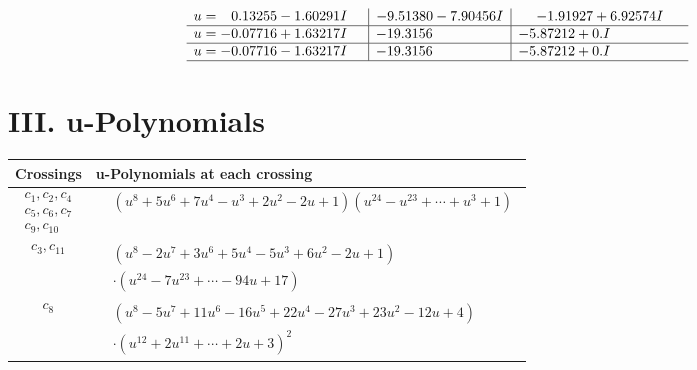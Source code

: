 \documentclass[1p]{elsarticle_modified}
\theoremstyle{definition}
\begin{document}
$$\begin{array}{c|c|c}
\begin{aligned}
u &= \phantom{-}0.13255 - 1.60291 I\end{aligned}
 & -9.51380 - 7.90456 I & -1.91927 + 6.92574 I \\ \hline\begin{aligned}
u &= -0.07716 + 1.63217 I\end{aligned}
 & -19.3156\phantom{ +0.000000I} & -5.87212 + 0. I\phantom{ +0.000000I} \\ \hline\begin{aligned}
u &= -0.07716 - 1.63217 I\end{aligned}
 & -19.3156\phantom{ +0.000000I} & -5.87212 + 0. I\phantom{ +0.000000I}\\
 \hline 
 \end{array}$$\newpage
\newpage\renewcommand{\arraystretch}{1}
\centering \section*{ III. u-Polynomials}
\begin{tabular}{m{50pt}|m{274pt}}
Crossings & \hspace{64pt}u-Polynomials at each crossing \\
\hline $$\begin{aligned}c_{1},c_{2},c_{4}\\c_{5},c_{6},c_{7}\\c_{9},c_{10}\end{aligned}$$&$\begin{aligned}
&(u^8+5 u^6+7 u^4- u^3+2 u^2-2 u+1)(u^{24}- u^{23}+\cdots+u^3+1)
\end{aligned}$\\
\hline $$\begin{aligned}c_{3},c_{11}\end{aligned}$$&$\begin{aligned}
&(u^8-2 u^7+3 u^6+5 u^4-5 u^3+6 u^2-2 u+1)\\
&\cdot(u^{24}-7 u^{23}+\cdots-94 u+17)
\end{aligned}$\\
\hline $$\begin{aligned}c_{8}\end{aligned}$$&$\begin{aligned}
&(u^8-5 u^7+11 u^6-16 u^5+22 u^4-27 u^3+23 u^2-12 u+4)\\
&\cdot(u^{12}+2 u^{11}+\cdots+2 u+3)^{2}
\end{aligned}$\\
\hline
\end{tabular}\newpage\renewcommand{\arraystretch}{1}
\end{document}
